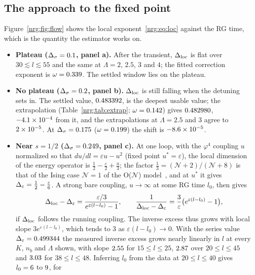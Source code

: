 \subsection{The approach to the fixed point}\label{nrg:sec:approach}
Figure~\ref{nrg:fig:flow} shows the local exponent~\eqref{nrg:eq:loc} against the RG time, which is the quantity the estimator works on.
\begin{itemize}
\item \textbf{Plateau ($\Delta_\sigma=0.1$, panel a).} After the transient, $\Delta_{\rm loc}$ is flat over $30\lesssim l\lesssim55$ and the same at
  $\Lambda=2$, $2.5$, $3$ and $4$; the fitted correction exponent is $\omega=0.339$. The settled window lies on the plateau.
\item \textbf{No plateau ($\Delta_\sigma=0.2$, panel b).} $\Delta_{\rm loc}$ is still falling when the detuning sets in. The settled value,
  $0.483392$, is the deepest usable value; the extrapolation (Table~\ref{nrg:tab:extrap}; $\omega=0.142$) gives
  $0.482980$, $-4.1\times10^{-4}$ from it, and the extrapolations at $\Lambda=2.5$ and $3$ agree to $2\times10^{-5}$.
  At $\Delta_\sigma=0.175$ ($\omega=0.199$) the shift is $-8.6\times10^{-5}$.
\item \textbf{Near $s=1/2$ ($\Delta_\sigma=0.249$, panel c).} At one loop, with the $\varphi^4$ coupling $u$ normalized so that
  $du/dl=\varepsilon u-u^2$ (fixed point $u^*=\varepsilon$), the local dimension of the energy operator is
  $\frac12-\frac\varepsilon2+\frac u3$; the factor $\frac13=(\mathcal N+2)/(\mathcal N+8)$ is that of the Ising case $\mathcal N=1$
  of the O($\mathcal N$) model~\cite{nrg:Fisher1972}, and at $u^*$ it gives $\Delta_\varepsilon=\frac12-\frac\varepsilon6$. A strong bare coupling,
  $u\to\infty$ at some RG time $l_0$, then gives
  \begin{equation}
  \Delta_{\rm loc}-\Delta_\varepsilon=\frac{\varepsilon/3}{e^{\varepsilon(l-l_0)}-1},\qquad \frac1{\Delta_{\rm loc}-\Delta_\varepsilon}=\frac3\varepsilon\big(e^{\varepsilon(l-l_0)}-1\big),
  \label{nrg:eq:oneloop}
  \end{equation}
  if $\Delta_{\rm loc}$ follows the running coupling. The inverse excess thus grows with local slope $3e^{\varepsilon(l-l_0)}$, which tends to 3
  as $\varepsilon(l-l_0)\to0$. With the series value $\Delta_\varepsilon=0.499344$ the measured inverse excess grows nearly linearly in $l$
  at every $K$, $n_b$ and $\Lambda$ shown, with slope $2.55$ for $15\le l\le25$, $2.87$ over $20\le l\le45$ and
  $3.03$ for $38\le l\le48$. Inferring $l_0$ from the data at $20\le l\le40$ gives $l_0=6$ to $9$, for

\end{itemize}
